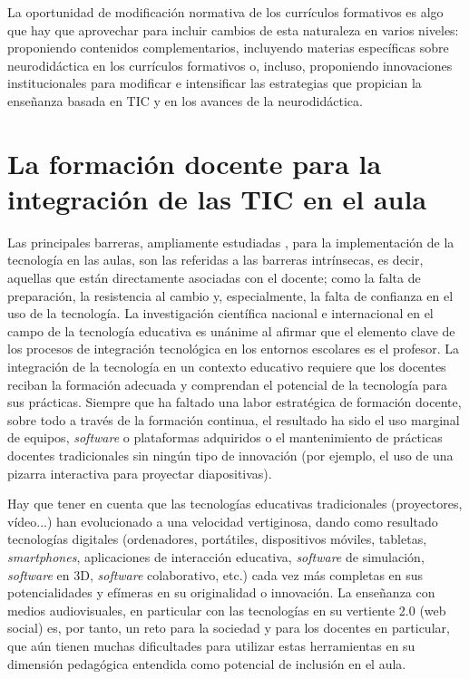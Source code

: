 \documentclass[spanish]{textolivre}
\begin{document}
La oportunidad de modificación normativa de los currículos formativos es algo que hay que aprovechar para incluir cambios de esta naturaleza en varios niveles: proponiendo contenidos complementarios, incluyendo materias específicas sobre neurodidáctica en los currículos formativos o, incluso, proponiendo innovaciones institucionales para modificar e intensificar las estrategias que propician la enseñanza basada en TIC y en los avances de la neurodidáctica.

\section{La formación docente para la integración de las TIC en el aula}\label{sec-normas}
Las principales barreras, ampliamente estudiadas \cite{bingimlas_barriers_2009}, para la implementación de la tecnología en las aulas, son las referidas a las barreras intrínsecas, es decir, aquellas que están directamente asociadas con el docente; como la falta de preparación, la resistencia al cambio y, especialmente, la falta de confianza en el uso de la tecnología. La investigación científica nacional e internacional en el campo de la tecnología educativa es unánime al afirmar que el elemento clave de los procesos de integración tecnológica en los entornos escolares es el profesor. La integración de la tecnología en un contexto educativo requiere que los docentes reciban la formación adecuada y comprendan el potencial de la tecnología para sus prácticas. Siempre que ha faltado una labor estratégica de formación docente, sobre todo a través de la formación continua, el resultado ha sido el uso marginal de equipos, \textit{software} o plataformas adquiridos o el mantenimiento de prácticas docentes tradicionales sin ningún tipo de innovación (por ejemplo, el uso de una pizarra interactiva para proyectar diapositivas).

Hay que tener en cuenta que las tecnologías educativas tradicionales (proyectores, vídeo...) han evolucionado a una velocidad vertiginosa, dando como resultado tecnologías digitales (ordenadores, portátiles, dispositivos móviles, tabletas, \textit{smartphones}, aplicaciones de interacción educativa, \textit{software} de simulación, \textit{software} en 3D, \textit{software} colaborativo, etc.) cada vez más completas en sus potencialidades y efímeras en su originalidad o innovación. La enseñanza con medios audiovisuales, en particular con las tecnologías en su vertiente 2.0 (web social) es, por tanto, un reto para la sociedad y para los docentes en particular, que aún tienen muchas dificultades para utilizar estas herramientas en su dimensión pedagógica entendida como potencial de inclusión en el aula.
\end{document}
